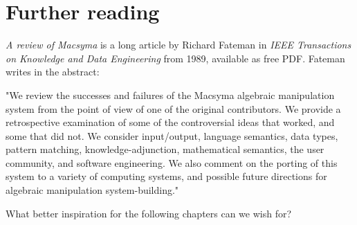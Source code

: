 \documentclass[../Maxima_Workbook.tex]{subfiles}
\begin{document}
\section{Further reading}

\emph{A review of Macsyma} is a long article by Richard Fateman in \emph{IEEE Transactions on Knowledge and Data Engineering} from 1989, available as free PDF. Fateman writes in the abstract:

\lz "We review the successes and failures of the Macsyma algebraic manipulation system from the point of view of one of the original contributors. We provide a retrospective examination of some of the controversial ideas that worked, and some that did not. We consider input/output, language semantics, data types, pattern matching, knowledge-adjunction, mathematical semantics, the user community, and software engineering. We also comment on the porting of this system to a variety of computing systems, and possible future directions for algebraic manipulation system-building."

\lz What better inspiration for the following chapters can we wish for?
\end{document}
